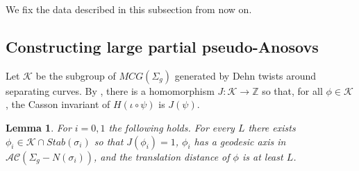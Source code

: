 \documentclass[11pt, oneside]{amsart}
\newtheorem{lemma}{Lemma}[section]
\theoremstyle{definition}
\theoremstyle{definition}
\newcommand{\calH} {\ensuremath {\mathcal{H}}}
\newcommand{\calD} {\ensuremath {\mathcal{D}}}
\begin{document}
 We fix the data described in this subsection from now on.
 

 
 
 \subsection{Constructing large partial pseudo-Anosovs}

 Let $\mathcal K$ be the subgroup of $MCG(\Sigma_g)$ generated by Dehn twists around separating curves. By \cite{Morita}, there is a homomorphism $J:\mathcal K\to \mathbb Z$ so that, for all $\phi\in\mathcal K$, the Casson invariant of $H(\iota\circ\psi)$ is $J(\psi)$.
 
 \begin{lemma}\label{lem:product_twists}
 For $i=0,1$ the following holds. For every $L$ there exists $\phi_i\in \mathcal K\cap Stab(\sigma_i)$ so that $J(\phi_i)=1$, $\phi_i$ has a geodesic axis in $\mathcal {AC}(\Sigma_g- N(\sigma_i))$, and the translation distance of $\phi$ is at least $L$.
 \end{lemma}
 
\end{document}
